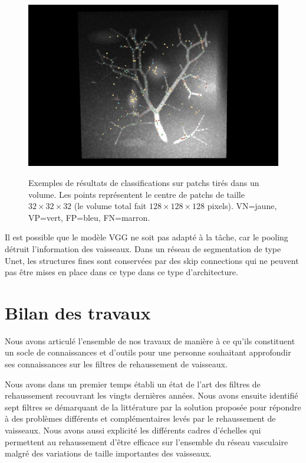 \begin{figure}[ht]
    \centering
    \includegraphics[height=8cm]{Images/exp_bifurcations.png}
    \caption{Exemples de résultats de classifications sur patchs tirés dans un volume. Les points représentent le centre de patchs de taille $32 \times 32 \times 32$ (le volume total fait $128 \times 128 \times 128$ pixels). VN=jaune, VP=vert, FP=bleu, FN=marron.}
    \label{fig:exp_patchs}
\end{figure}

Il est possible que le modèle VGG ne soit pas adapté à la tâche, car le pooling détruit l'information des vaisseaux. Dans un réseau de segmentation de type Unet, les structures fines sont conservées par des skip connections qui ne peuvent pas être mises en place dans ce type dans ce type d'architecture.

\section{ Bilan des travaux}


Nous avons articulé l'ensemble de nos travaux de manière à ce qu'ils constituent un socle de connaissances et d'outils pour une personne souhaitant approfondir ses connaissances sur les filtres de rehaussement de vaisseaux. 

Nous avons dans un premier temps établi un état de l'art des filtres de rehaussement recouvrant les vingts dernières années. Nous avons ensuite identifié sept filtres se démarquant de la littérature par la solution proposée pour répondre à des problèmes différents et complémentaires levés par le rehaussement de vaisseaux. Nous avons aussi explicité les différents cadres d'échelles qui permettent au rehaussement d'être efficace sur l'ensemble du réseau vasculaire malgré des variations de taille importantes des vaisseaux.


